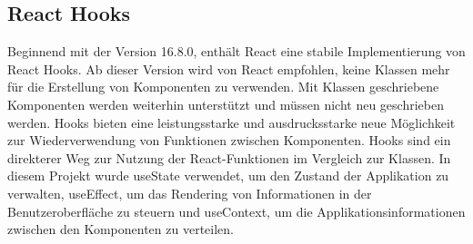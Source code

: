 \subsection{React Hooks}
Beginnend mit der Version 16.8.0, enthält React eine stabile Implementierung von React Hooks. Ab dieser Version wird von React empfohlen, keine Klassen mehr für die Erstellung von Komponenten zu verwenden\cite{R01}. Mit Klassen geschriebene Komponenten werden weiterhin unterstützt und müssen nicht neu geschrieben werden{\cite{R05}}. Hooks bieten eine leistungsstarke und ausdrucksstarke neue Möglichkeit zur Wiederverwendung von Funktionen zwischen Komponenten. Hooks sind ein direkterer Weg zur Nutzung der React-Funktionen im Vergleich zur Klassen. In diesem Projekt wurde useState verwendet, um den Zustand der Applikation zu verwalten, useEffect, um das Rendering von Informationen in der Benutzeroberfläche zu steuern und useContext, um die Applikationsinformationen zwischen den Komponenten zu verteilen. 

